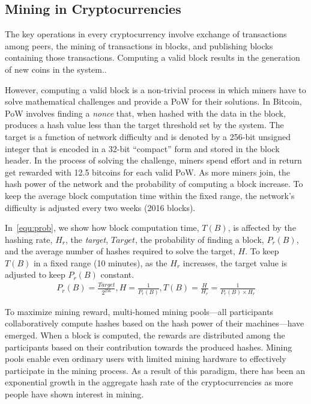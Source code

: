 \documentclass[acmlarge]{acmart}
\newcommand{\cc}{{cryptocurrency}\xspace}
\begin{document}
\subsection{Mining in Cryptocurrencies}\label{sec:mining}
The key operations in every \cc involve exchange of transactions among peers, the mining of transactions in blocks, and publishing blocks containing those transactions. Computing a valid block results in the generation of new coins in the system..


However, computing a valid block is a non-trivial process in which miners have to solve mathematical challenges and provide a PoW for their solutions. In Bitcoin, PoW involves finding a \textit{nonce} that, when hashed with the data in the block, produces a hash value less than the target threshold set by the system. The target is a function of network difficulty and is denoted by a 256-bit unsigned integer that is encoded in a 32-bit ``compact'' form and stored in the block header. In the process of solving the challenge, miners spend effort and in return get rewarded with 12.5 bitcoins for each valid PoW. As more miners join, the hash power of the network and the probability of computing a block increase. To keep the average block computation time within the fixed range, the network's difficulty is adjusted every two weeks (2016 blocks).


In~\autoref{equ:prob}, we show how block computation time, $T(B)$, is affected by the hashing rate, $H_r$, the {\em target}, $Target$, the probability of finding a block, $P_r(B)$, and the average number of hashes required to solve the target, $H$. To keep  $T(B)$ in a fixed range (10 minutes), as the $H_r$ increases, the target value is adjusted to keep $P_r(B)$ constant. 
\begin{align} 
  \label{equ:prob}  P_r(B)  = \frac{Target}  {2^{256}},  H = \frac{1}{P_r(B)}, T(B) = \frac{H}{H_r} = \frac{1}{P_r(B)\times H_r}
\end{align}

To maximize mining reward, multi-homed mining pools---all participants collaboratively compute hashes based on the hash power of their machines---have emerged. When a block is computed, the rewards are distributed among the participants based on their contribution towards the produced hashes. Mining pools enable even ordinary users with limited mining hardware to effectively participate in the mining process. As a result of this paradigm, there has been an exponential growth in the aggregate hash rate of the cryptocurrencies as more people have shown interest in mining. 
\end{document}
